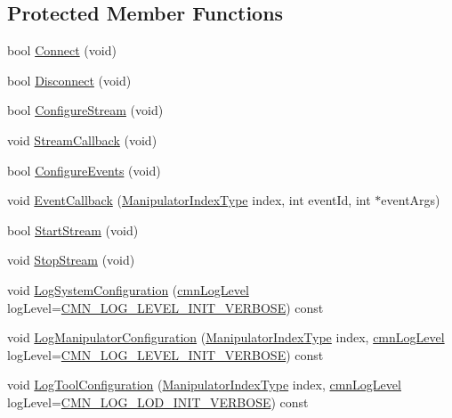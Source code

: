 \subsection*{Protected Member Functions}
\begin{DoxyCompactItemize}
\item 
bool \hyperlink{classmts_intuitive_da_vinci_a1c7a11d91811719e85d07e69bbb36bb3}{Connect} (void)
\item 
bool \hyperlink{classmts_intuitive_da_vinci_aed9a190c4308a6d2d3b2beb8a33e797b}{Disconnect} (void)
\item 
bool \hyperlink{classmts_intuitive_da_vinci_a57cf6b0b4b903a23b1a24fe94da730e2}{Configure\-Stream} (void)
\item 
void \hyperlink{classmts_intuitive_da_vinci_ad78560093b99be66a0f40502145f2c38}{Stream\-Callback} (void)
\item 
bool \hyperlink{classmts_intuitive_da_vinci_a16c2a6008fbd486878aa6774a4d49d5f}{Configure\-Events} (void)
\item 
void \hyperlink{classmts_intuitive_da_vinci_a0e5df412e4b6fc1f9752942626d10f1e}{Event\-Callback} (\hyperlink{classmts_intuitive_da_vinci_a32a63e2057b2c00c8f08685f8f5736f4}{Manipulator\-Index\-Type} index, int event\-Id, int $\ast$event\-Args)
\item 
bool \hyperlink{classmts_intuitive_da_vinci_a5f080d90e55a9ed84c21800f8f49dbce}{Start\-Stream} (void)
\item 
void \hyperlink{classmts_intuitive_da_vinci_a220ac807e83874eff2f243ee881ab4c8}{Stop\-Stream} (void)
\item 
void \hyperlink{classmts_intuitive_da_vinci_a085407a34a4d45778710482d3edba3e7}{Log\-System\-Configuration} (\hyperlink{cmn_log_lo_d_8h_a70c67165c37a0971e0dd1a85d4edaaae}{cmn\-Log\-Level} log\-Level=\hyperlink{cmn_log_lo_d_8h_ae0fcf22a2f3faaba0c5bf49a237e3f3e}{C\-M\-N\-\_\-\-L\-O\-G\-\_\-\-L\-E\-V\-E\-L\-\_\-\-I\-N\-I\-T\-\_\-\-V\-E\-R\-B\-O\-S\-E}) const 
\item 
void \hyperlink{classmts_intuitive_da_vinci_a0c7d45062de8ee765c912897c67922ad}{Log\-Manipulator\-Configuration} (\hyperlink{classmts_intuitive_da_vinci_a32a63e2057b2c00c8f08685f8f5736f4}{Manipulator\-Index\-Type} index, \hyperlink{cmn_log_lo_d_8h_a70c67165c37a0971e0dd1a85d4edaaae}{cmn\-Log\-Level} log\-Level=\hyperlink{cmn_log_lo_d_8h_ae0fcf22a2f3faaba0c5bf49a237e3f3e}{C\-M\-N\-\_\-\-L\-O\-G\-\_\-\-L\-E\-V\-E\-L\-\_\-\-I\-N\-I\-T\-\_\-\-V\-E\-R\-B\-O\-S\-E}) const 
\item 
void \hyperlink{classmts_intuitive_da_vinci_a5c70042fc47eb53118c1a9b489c8052b}{Log\-Tool\-Configuration} (\hyperlink{classmts_intuitive_da_vinci_a32a63e2057b2c00c8f08685f8f5736f4}{Manipulator\-Index\-Type} index, \hyperlink{cmn_log_lo_d_8h_a70c67165c37a0971e0dd1a85d4edaaae}{cmn\-Log\-Level} log\-Level=\hyperlink{cmn_log_lo_d_8h_a019ecc9e1487050d540772de22800f44}{C\-M\-N\-\_\-\-L\-O\-G\-\_\-\-L\-O\-D\-\_\-\-I\-N\-I\-T\-\_\-\-V\-E\-R\-B\-O\-S\-E}) const 

\end{DoxyCompactItemize}
